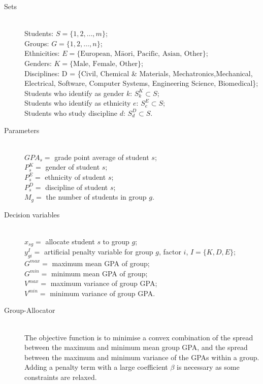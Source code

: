 \documentclass[12pt]{ORSNZ}
\begin{document}
\begin{description}
\item[Sets] \mbox{}\\
        Students: $S = \{1, 2, \dots, m\}$;\\
        Groups: $G = \{1, 2, \dots, n\}$;\\
        Ethnicities: $E = \{\mbox{European, M\=aori, Pacific, Asian, Other}\}$;\\
        Genders: $K = \{\mbox{Male, Female, Other}\}$;\\
        Disciplines: D = \{Civil, Chemical \& Materials, Mechatronics,Mechanical, Electrical, Software, Computer Systems, Engineering Science, Biomedical\};
        Students who identify as gender $k$: $S^K_k \subset S$;\\
        Students who identify as ethnicity $e$: $S^E_e \subset S$;\\
        Students who study discipline $d$: $S^D_d \subset S$.



\item[Parameters] \mbox{} \\
$GPA_s = $ grade point average of student $s$; \\
$P^K_s = $ gender of student $s$; \\
$P^E_s = $ ethnicity of student $s$; \\
$P^D_s = $ discipline of student $s$; \\
$M_g = $ the number of students in group $g$.

\item[Decision variables]\mbox{} \\
$x_{sg} = $ allocate student $s$ to group $g$;\\
$y^I_{gi} = $ artificial penalty variable for group $g$, factor $i$, \qquad $I=\{K, D, E\}$;\\

$G^{max} = $ maximum mean GPA of group;\\
$G^{min} = $ minimum mean GPA of group;\\
$V^{max} = $ maximum variance of group GPA;\\
$V^{min} = $  minimum variance of group GPA.


\item[Group-Allocator]\mbox{} \\
The objective function is to minimise a convex combination of the spread between the maximum and minimum mean group GPA, and the spread between the maximum and minimum variance of the GPAs within a group. Adding a penalty term with a large coefficient $\beta$ is necessary as some constraints are relaxed.



\end{description}
\end{document}
